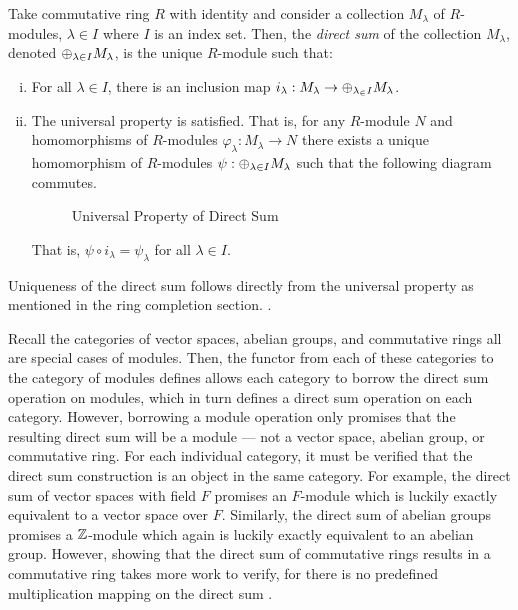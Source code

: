 \documentclass[../sean_thesis.tex]{subfiles}
\begin{document}
\begin{definition}
	Take commutative ring $R$ with identity and consider a collection $M_\lambda$ of $R$-modules, $\lambda \in I$ where $I$ is an index set. Then, the \emph{direct sum} of the collection $M_\lambda$, denoted $\oplus_{\lambda \in I} M_\lambda$, is the unique $R$-module such that:
\vspace{-\varparskip}
	\begin{enumerate}[(i)]
		\item For all $\lambda \in I$, there is an inclusion map $i_\lambda: M_\lambda \to \oplus_{\lambda_\in I}M_\lambda$.
		\item The universal property is satisfied. That is, for any $R$-module $N$ and homomorphisms of $R$-modules $\varphi_\lambda: M_\lambda \to N$ there exists a unique homomorphism of $R$-modules $\psi: \oplus_{\lambda \in I} M_\lambda$ such that the following diagram commutes.
		\begin{figure}[ht!]
			
			\caption{Universal Property of Direct Sum}
			\label{fig:direct_sum_univ_property}
		\end{figure}
		That is, $\psi \circ i_\lambda = \psi_\lambda$ for all $\lambda \in I$.
	\end{enumerate}
\end{definition}
Uniqueness of the direct sum follows directly from the universal property as mentioned in the ring completion section. .

Recall the categories of vector spaces, abelian groups, and commutative rings all are special cases of modules. Then, the functor from each of these categories to the category of modules defines allows each category to borrow the direct sum operation on modules, which in turn defines a direct sum operation on each category. However, borrowing a module operation only promises that the resulting direct sum will be a module --- not a vector space, abelian group, or commutative ring. For each individual category, it must be verified that the direct sum construction is an object in the same category. For example, the direct sum of vector spaces with field $F$ promises an $F$-module which is luckily exactly equivalent to a vector space over $F$. Similarly, the direct sum of abelian groups promises a $\mathbb{Z}$-module which again is luckily exactly equivalent to an abelian group. However, showing that the direct sum of commutative rings results in a commutative ring takes more work to verify, for there is no predefined multiplication mapping on the direct sum .
\end{document}
